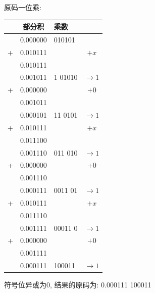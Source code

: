 \documentclass[UTF8]{report}
\newcommand{\ra}{\rightarrow}
\newenvironment{solution}{{\noindent\hskip 2em \bf 解 \quad}}{}
\begin{document}
\begin{solution}
\begin{enumerate}
        原码一位乘:
        \begin{tabular}{cc|l|c}
             & 部分积     & 乘数     & \\
            \hline
             & 0.000000 & 010101  &         \\
            +& 0.010111 &         & $+x$    \\
            \hline
             & 0.010111 &         &         \\
             & 0.001011 & 1 01010 & $\ra 1$ \\
            +& 0.000000 &         & $+0$    \\
            \hline
             & 0.001011 &         &         \\
             & 0.000101 & 11 0101 & $\ra 1$ \\
            +& 0.010111 &         & $+x$    \\
            \hline
             & 0.011100 &         &         \\
             & 0.001110 & 011 010 & $\ra 1$ \\
            +& 0.000000 &         & $+0$    \\
            \hline
             & 0.001110 &         &         \\
             & 0.000111 & 0011 01 & $\ra 1$ \\
            +& 0.010111 &         & $+x$    \\
            \hline
             & 0.011110 &         &         \\
             & 0.001111 & 00011 0 & $\ra 1$ \\
            +& 0.000000 &         & $+0$    \\
            \hline
             & 0.001111 &         &         \\
             & 0.000111 & 100011  & $\ra 1$ \\
        \end{tabular}
        
        符号位异或为0, 结果的原码为: 0.000111 100011
        

\end{enumerate}
\end{solution}
\end{document}
